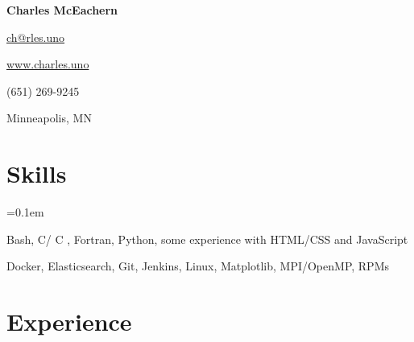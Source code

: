 \documentclass[11pt,letterpaper]{article}
\newcommand{\ResumeSection}[1]{
    \section*{ {\color{MidnightBlue}#1 \sout{\hfill} } }
}
\newcommand{\URL}[1]{\href{#1}{#1}\xspace}
\newcommand{\CPP}{
    C\nolinebreak[4]\hspace{-.05em}\raisebox{.22ex}{\footnotesize\bf ++}\xspace
}
\newcommand{\hbump}{\hspace{0.4in}}
\newcommand{\hbmp}{\hspace{0.02in}}
\begin{document}


\begin{center}
    { \Huge \textbf{Charles McEachern} }

    \vspace{12pt}

    
    \hbmp
    \href{mailto:ch@rles.uno}{ch@rles.uno}
    \hbump
    
    \hbmp
    \URL{www.charles.uno}
    \hbump
    
    \hbmp
    (651) 269-9245
    \hbump
    
    \hbmp
    Minneapolis, MN

\end{center}


\ResumeSection{Skills}

\begin{description}[leftmargin=!, labelindent=\parindent,
                    labelwidth=\widthof{\bfseries Languages}]
    \parskip=0.1em

    \item[Languages]
        Bash, C/\CPP, Fortran, Python, some experience with HTML/CSS and JavaScript

    \item[Tools]
        Docker, Elasticsearch, Git, Jenkins, Linux, Matplotlib, MPI/OpenMP, RPMs

\end{description}



\ResumeSection{Experience}
\end{document}
